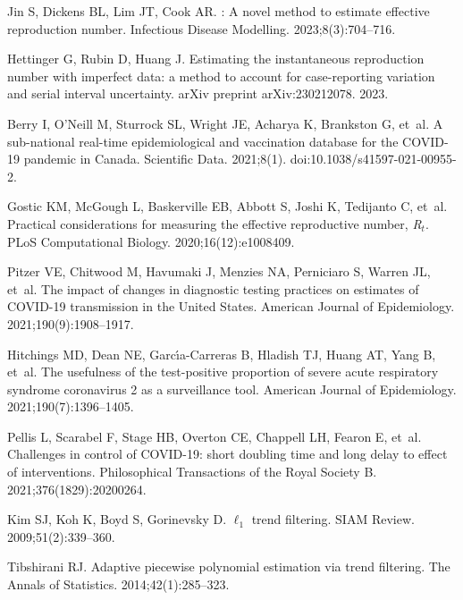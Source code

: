\documentclass[10pt,letterpaper]{article}
\begin{document}
\begin{thebibliography}{10}
  Jin S, Dickens BL, Lim JT, Cook AR.
  : A novel method to estimate effective reproduction number.
  \newblock Infectious Disease Modelling. 2023;8(3):704--716.
  
  Hettinger G, Rubin D, Huang J.
  \newblock Estimating the instantaneous reproduction number with imperfect data:
    a method to account for case-reporting variation and serial interval
    uncertainty.
  \newblock arXiv preprint arXiv:230212078. 2023.
  
  Berry I, O'Neill M, Sturrock SL, Wright JE, Acharya K, Brankston G, et~al.
  \newblock A sub-national real-time epidemiological and vaccination database for
    the {COVID}-19 pandemic in Canada.
  \newblock Scientific Data. 2021;8(1).
  \newblock doi:{10.1038/s41597-021-00955-2}.
  
  Gostic KM, McGough L, Baskerville EB, Abbott S, Joshi K, Tedijanto C, et~al.
  \newblock Practical considerations for measuring the effective reproductive
    number, \emph{R}$_t$.
  \newblock PLoS Computational Biology. 2020;16(12):e1008409.
  
  Pitzer VE, Chitwood M, Havumaki J, Menzies NA, Perniciaro S, Warren JL, et~al.
  \newblock The impact of changes in diagnostic testing practices on estimates of
    {COVID-19} transmission in the {U}nited {S}tates.
  \newblock American Journal of Epidemiology. 2021;190(9):1908--1917.
  
  Hitchings MD, Dean NE, Garc{\'\i}a-Carreras B, Hladish TJ, Huang AT, Yang B,
    et~al.
  \newblock The usefulness of the test-positive proportion of severe acute
    respiratory syndrome coronavirus 2 as a surveillance tool.
  \newblock American Journal of Epidemiology. 2021;190(7):1396--1405.
  
  Pellis L, Scarabel F, Stage HB, Overton CE, Chappell LH, Fearon E, et~al.
  \newblock Challenges in control of {COVID-19}: short doubling time and long
    delay to effect of interventions.
  \newblock Philosophical Transactions of the Royal Society B.
    2021;376(1829):20200264.
  
  Kim SJ, Koh K, Boyd S, Gorinevsky D.
  \newblock $\ell_1$ trend filtering.
  \newblock SIAM Review. 2009;51(2):339--360.
  
  Tibshirani RJ.
  \newblock Adaptive piecewise polynomial estimation via trend filtering.
  \newblock The Annals of Statistics. 2014;42(1):285--323.
  

\end{thebibliography}
\end{document}
